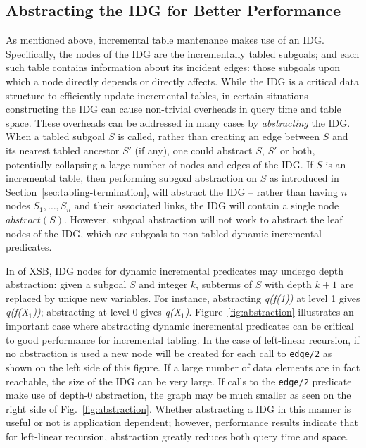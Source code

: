 \subsection{Abstracting the IDG for Better Performance} \label{sec:IDG-abs}
As mentioned above, incremental table mantenance makes use of an IDG.
Specifically, the nodes of the IDG are the incrementally tabled
subgoals; and each such table contains information about its incident
edges: those subgoals upon which a node directly depends or directly
affects.  While the IDG is a critical data structure to efficiently
update incremental tables, in certain situations constructing the IDG
can cause non-trivial overheads in query time and table space.  These
overheads can be addressed in many cases by {\em abstracting} the IDG.
When a tabled subgoal $S$ is called, rather than creating an edge
between $S$ and its nearest tabled ancestor $S'$ (if any), one could
abstract $S$, $S'$ or both, potentially collapsing a large number of
nodes and edges of the IDG.  If $S$ is an incremental table, then
performing subgoal abstraction on $S$ as introduced in
Section~\ref{sec:tabling-termination}, will abstract the IDG -- rather
than having $n$ nodes $S_1,\ldots,S_n$ and their associated links, the
IDG will contain a single node $abstract(S)$.  However, subgoal
abstraction will not work to abstract the leaf nodes of the IDG, which
are subgoals to non-tabled dynamic incremental predicates.

In \version{} of XSB, IDG nodes for dynamic incremental predicates may
undergo depth abstraction: given a subgoal $S$ and integer $k$,
subterms of $S$ with depth $k+1$ are replaced by unique new variables.
For instance, abstracting
{\em q(f(1))} at level 1 gives {\em q(f(X$_1$))}; abstracting at level
0 gives {\em q(X$_1$)}.
%
Figure~\ref{fig:abstraction} illustrates an important case where
abstracting dynamic incremental predicates can be critical to good
performance for incremental tabling.  In the case of left-linear
recursion, if no abstraction is used a new node will be created for
each call to {\tt edge/2} as shown on the left side of this figure.
If a large number of data elements are in fact reachable, the size of
the IDG can be very large.  If calls to the {\tt edge/2} predicate
make use of depth-0 abstraction, the graph may be much smaller as seen
on the right side of Fig.~\ref{fig:abstraction}.  Whether abstracting
a IDG in this manner is useful or not is application dependent;
however, performance results indicate that for left-linear recursion,
abstraction greatly reduces both query time and space.


